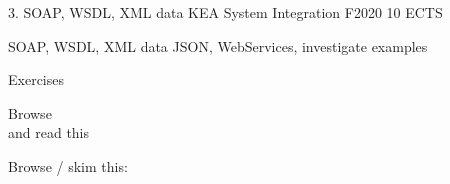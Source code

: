 \documentclass[Screen16to9,17pt]{foils}
\begin{document}
\mytitlepage
{3. SOAP, WSDL, XML data}
{KEA System Integration F2020 10 ECTS}


\begin{list2}
\item SOAP, WSDL, XML data
 JSON, WebServices, investigate examples
\item
\item
\end{list2}

Exercises
\begin{list2}
\item
\item
\end{list2}




\begin{list1}
\item Browse\\

and read this\\

\item Browse / skim this:\\

\end{list1}




\slidenext
\end{document}
